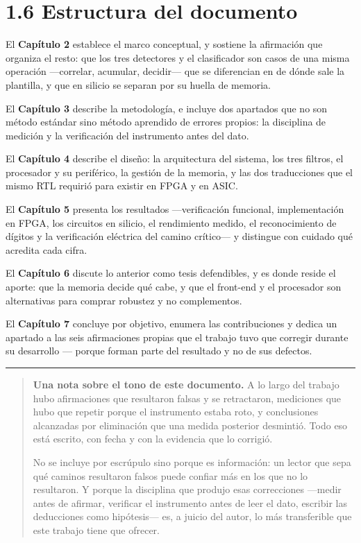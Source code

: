 \section{1.6 Estructura del documento}\label{estructura-del-documento}

El \textbf{Capítulo 2} establece el marco conceptual, y sostiene la
afirmación que organiza el resto: que los tres detectores y el
clasificador son casos de una misma operación ---correlar, acumular,
decidir--- que se diferencian en de dónde sale la plantilla, y que en
silicio se separan por su huella de memoria.

El \textbf{Capítulo 3} describe la metodología, e incluye dos apartados
que no son método estándar sino método aprendido de errores propios: la
disciplina de medición y la verificación del instrumento antes del dato.

El \textbf{Capítulo 4} describe el diseño: la arquitectura del sistema,
los tres filtros, el procesador y su periférico, la gestión de la
memoria, y las dos traducciones que el mismo RTL requirió para existir
en FPGA y en ASIC.

El \textbf{Capítulo 5} presenta los resultados ---verificación
funcional, implementación en FPGA, los circuitos en silicio, el
rendimiento medido, el reconocimiento de dígitos y la verificación
eléctrica del camino crítico--- y distingue con cuidado qué acredita
cada cifra.

El \textbf{Capítulo 6} discute lo anterior como tesis defendibles, y es
donde reside el aporte: que la memoria decide qué cabe, y que el
front-end y el procesador son alternativas para comprar robustez y no
complementos.

El \textbf{Capítulo 7} concluye por objetivo, enumera las contribuciones
y dedica un apartado a las seis afirmaciones propias que el trabajo tuvo
que corregir durante su desarrollo --- porque forman parte del resultado
y no de sus defectos.

\begin{center}\rule{0.5\linewidth}{0.5pt}\end{center}

\begin{quote}
\textbf{Una nota sobre el tono de este documento.} A lo largo del
trabajo hubo afirmaciones que resultaron falsas y se retractaron,
mediciones que hubo que repetir porque el instrumento estaba roto, y
conclusiones alcanzadas por eliminación que una medida posterior
desmintió. Todo eso está escrito, con fecha y con la evidencia que lo
corrigió.

No se incluye por escrúpulo sino porque es información: un lector que
sepa qué caminos resultaron falsos puede confiar más en los que no lo
resultaron. Y porque la disciplina que produjo esas correcciones
---medir antes de afirmar, verificar el instrumento antes de leer el
dato, escribir las deducciones como hipótesis--- es, a juicio del autor,
lo más transferible que este trabajo tiene que ofrecer.
\end{quote}

